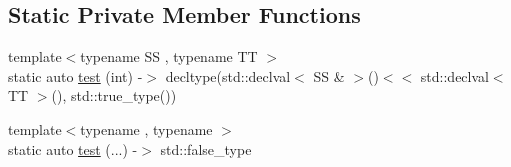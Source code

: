 \subsection*{Static Private Member Functions}
\begin{DoxyCompactItemize}
\item 
{\footnotesize template$<$typename S\-S , typename T\-T $>$ }\\static auto \hyperlink{class_catch_1_1_detail_1_1_is_stream_insertable_ac5981238a76d66e36b3d014aa870d15c}{test} (int) -\/$>$ decltype(std\-::declval$<$ S\-S \& $>$()$<$$<$ std\-::declval$<$ T\-T $>$(), std\-::true\-\_\-type())
\item 
{\footnotesize template$<$typename , typename $>$ }\\static auto \hyperlink{class_catch_1_1_detail_1_1_is_stream_insertable_ac5761375646929916dc5e165d44cd3d9}{test} (...) -\/$>$ std\-::false\-\_\-type
\end{DoxyCompactItemize}


